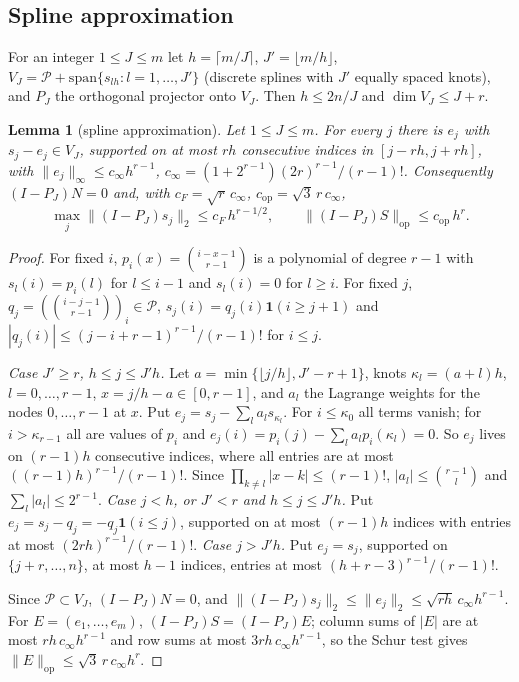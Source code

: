 \documentclass[11pt]{article}
\newtheorem{lemma}{Lemma}
\theoremstyle{definition}
\theoremstyle{remark}
\newcommand{\cP}{\mathcal P}
\newcommand{\ind}{\mathbf 1}
\newcommand{\op}{\mathrm{op}}
\begin{document}
\subsection{Spline approximation}

For an integer $1\le J\le m$ let $h=\lceil m/J\rceil$, $J'=\lfloor m/h\rfloor$, $V_J=\cP+\mathrm{span}\{s_{lh}:l=1,\dots,J'\}$ (discrete splines with $J'$ equally spaced knots), and $P_J$ the orthogonal projector onto $V_J$. Then $h\le2n/J$ and $\dim V_J\le J+r$.

\begin{lemma}[spline approximation]\label{lem:F}
Let $1\le J\le m$. For every $j$ there is $e_j$ with $s_j-e_j\in V_J$, supported on at most $rh$ consecutive indices in $[j-rh,j+rh]$, with $\|e_j\|_\infty\le c_\infty h^{r-1}$, $c_\infty=(1+2^{r-1})(2r)^{r-1}/(r-1)!$. Consequently $(I-P_J)N=0$ and, with $c_F=\sqrt r\,c_\infty$, $c_{\op}=\sqrt3\,r\,c_\infty$,
\begin{equation}\label{eq:F}
\max_{j}\|(I-P_J)s_j\|_2\le c_F\,h^{r-1/2},\qquad \|(I-P_J)S\|_{\op}\le c_{\op}\,h^{r}.
\end{equation}
\end{lemma}

\begin{proof}
For fixed $i$, $p_i(x)=\binom{i-x-1}{r-1}$ is a polynomial of degree $r-1$ with $s_l(i)=p_i(l)$ for $l\le i-1$ and $s_l(i)=0$ for $l\ge i$. For fixed $j$, $q_j=(\binom{i-j-1}{r-1})_i\in\cP$, $s_j(i)=q_j(i)\ind(i\ge j+1)$ and $|q_j(i)|\le(j-i+r-1)^{r-1}/(r-1)!$ for $i\le j$.

\emph{Case $J'\ge r$, $h\le j\le J'h$.} Let $a=\min\{\lfloor j/h\rfloor,J'-r+1\}$, knots $\kappa_l=(a+l)h$, $l=0,\dots,r-1$, $x=j/h-a\in[0,r-1]$, and $a_l$ the Lagrange weights for the nodes $0,\dots,r-1$ at $x$. Put $e_j=s_j-\sum_la_ls_{\kappa_l}$. For $i\le\kappa_0$ all terms vanish; for $i>\kappa_{r-1}$ all are values of $p_i$ and $e_j(i)=p_i(j)-\sum_la_lp_i(\kappa_l)=0$. So $e_j$ lives on $(r-1)h$ consecutive indices, where all entries are at most $((r-1)h)^{r-1}/(r-1)!$. Since $\prod_{k\ne l}|x-k|\le(r-1)!$, $|a_l|\le\binom{r-1}{l}$ and $\sum_l|a_l|\le2^{r-1}$.
\emph{Case $j<h$, or $J'<r$ and $h\le j\le J'h$.} Put $e_j=s_j-q_j=-q_j\ind(i\le j)$, supported on at most $(r-1)h$ indices with entries at most $(2rh)^{r-1}/(r-1)!$.
\emph{Case $j>J'h$.} Put $e_j=s_j$, supported on $\{j+r,\dots,n\}$, at most $h-1$ indices, entries at most $(h+r-3)^{r-1}/(r-1)!$.

Since $\cP\subset V_J$, $(I-P_J)N=0$, and $\|(I-P_J)s_j\|_2\le\|e_j\|_2\le\sqrt{rh}\,c_\infty h^{r-1}$. For $E=(e_1,\dots,e_m)$, $(I-P_J)S=(I-P_J)E$; column sums of $|E|$ are at most $rh\,c_\infty h^{r-1}$ and row sums at most $3rh\,c_\infty h^{r-1}$, so the Schur test gives $\|E\|_{\op}\le\sqrt3\,r\,c_\infty h^r$.
\end{proof}
\end{document}
